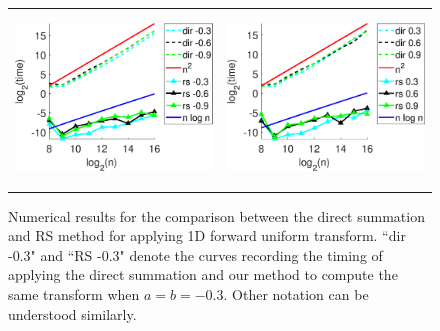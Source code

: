 \documentclass[11pt]{article}
\begin{document}
{}

\begin{figure}
  \begin{center}
    \begin{tabular}{cc}
      \includegraphics[height=1.80in]{pic/DirSum_RS1.eps}&
      \includegraphics[height=1.80in]{pic/DirSum_RS2.eps}\\
    \end{tabular}
  \end{center}
\caption{Numerical results for the comparison between the direct summation and RS method for applying 1D forward uniform transform. ``dir -0.3" and ``RS -0.3" denote the curves recording the timing of applying the direct summation and our method to compute the same transform when $a=b=-0.3$. Other notation can be understood similarly.}
\label{fig:comp1}
\end{figure}
\end{document}
